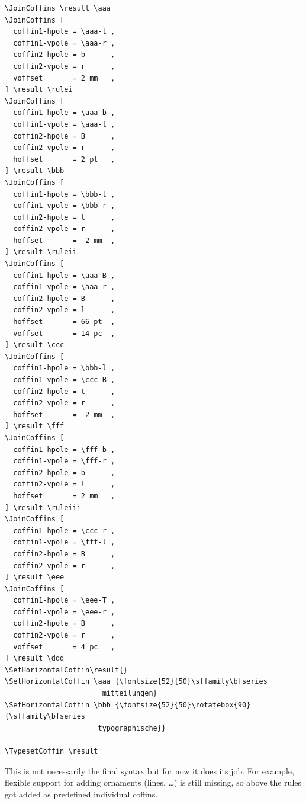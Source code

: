 \documentclass{article}
\begin{document}
\begin{center}
\begin{minipage}{14cm}
\begin{verbatim}
\JoinCoffins \result \aaa 
\JoinCoffins [ 
  coffin1-hpole = \aaa-t ,
  coffin1-vpole = \aaa-r ,
  coffin2-hpole = b      ,
  coffin2-vpole = r      ,
  voffset       = 2 mm   ,
] \result \rulei
\JoinCoffins [ 
  coffin1-hpole = \aaa-b ,
  coffin1-vpole = \aaa-l ,
  coffin2-hpole = B      ,
  coffin2-vpole = r      ,
  hoffset       = 2 pt   ,
] \result \bbb
\JoinCoffins [ 
  coffin1-hpole = \bbb-t ,
  coffin1-vpole = \bbb-r ,
  coffin2-hpole = t      ,
  coffin2-vpole = r      ,
  hoffset       = -2 mm  ,
] \result \ruleii
\JoinCoffins [ 
  coffin1-hpole = \aaa-B ,
  coffin1-vpole = \aaa-r ,
  coffin2-hpole = B      ,
  coffin2-vpole = l      ,
  hoffset       = 66 pt  ,
  voffset       = 14 pc  ,
] \result \ccc
\JoinCoffins [ 
  coffin1-hpole = \bbb-l ,
  coffin1-vpole = \ccc-B ,
  coffin2-hpole = t      ,
  coffin2-vpole = r      ,
  hoffset       = -2 mm  ,
] \result \fff
\JoinCoffins [ 
  coffin1-hpole = \fff-b ,
  coffin1-vpole = \fff-r ,
  coffin2-hpole = b      ,
  coffin2-vpole = l      ,
  hoffset       = 2 mm   ,
] \result \ruleiii
\JoinCoffins [ 
  coffin1-hpole = \ccc-r ,
  coffin1-vpole = \fff-l ,
  coffin2-hpole = B      ,
  coffin2-vpole = r      ,
] \result \eee
\JoinCoffins [ 
  coffin1-hpole = \eee-T ,
  coffin1-vpole = \eee-r ,
  coffin2-hpole = B      ,
  coffin2-vpole = r      ,
  voffset       = 4 pc   ,
] \result \ddd
\SetHorizontalCoffin\result{}
\SetHorizontalCoffin \aaa {\fontsize{52}{50}\sffamily\bfseries
                       mitteilungen}
\SetHorizontalCoffin \bbb {\fontsize{52}{50}\rotatebox{90}{\sffamily\bfseries 
                      typographische}}

\TypesetCoffin \result
\end{verbatim}

This is not necessarily the final syntax but for now it does its job. For
example, flexible support for adding ornaments (lines, \ldots) is still
missing, so above the rules got added as predefined individual coffins.

\end{minipage}
\end{center}
\end{document}
